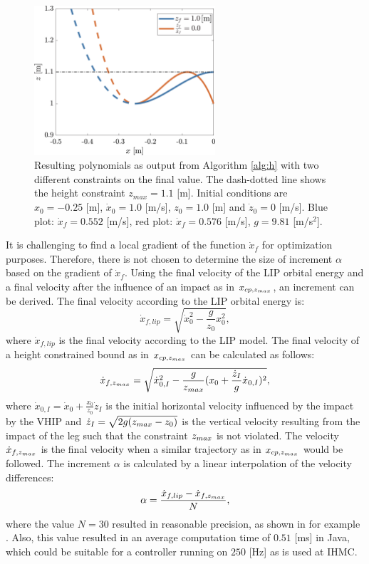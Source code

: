 \begin{figure}
\centering
\includegraphics[width=0.6\textwidth]{STYLESTUFF/polynomialHeightViz.png}
\caption{Resulting polynomials as output from Algorithm \ref{alg:h} with two different constraints on the final value. The dash-dotted line shows the height constraint $z_{max}=1.1$ [m]. Initial conditions are $x_0=-0.25$ [m], $\dot{x}_0=1.0$ [m/s], $z_0=1.0$ [m] and $\dot{z}_0=0$ [m/s]. Blue plot: $\dot{x}_f=0.552$ [m/s], red plot: $\dot{x}_f=0.576$ [m/s], $g=9.81$ [m/s$^2$]. }
\label{fig:polheight}
\end{figure}

It is challenging to find a local gradient of the function $\dot{x}_f$ for optimization purposes. Therefore, there is not chosen to determine the size of increment $\alpha$ based on the gradient of $\dot{x}_f$. Using the final velocity of the \ac{LIP} orbital energy and a final velocity after the influence of an impact as in $x_{cp,z_{max}}$, an increment can be derived. 
The final velocity according to the \ac{LIP} orbital energy is:
\begin{equation}
	\dot{x}_{f,lip} = \sqrt{\dot{x}_0^2-\frac{g}{z_0}x_0^2},
\end{equation}
where $\dot{x}_{f,lip}$ is the final velocity according to the \ac{LIP} model. The final velocity of a height constrained bound as in $x_{cp,z_{max}}$ can be calculated as follows:
\begin{equation}
	\dot{x}_{f,z_{max}} = \sqrt{\dot{x}_{0,I}^2-\frac{g}{z_{max}}(x_0+\frac{\dot{z}_I}{g}\dot{x}_{0,I})^2},
\end{equation}
where $\dot{x}_{0,I}=\dot{x}_0 + \frac{x_0}{z_0}\dot{z}_I$ is the initial horizontal velocity influenced by the impact by the \ac{VHIP} and $\dot{z}_I = \sqrt{2g(z_{max}-z_0)}$ is the vertical velocity resulting from the impact of the leg such that the constraint $z_{max}$ is not violated. The velocity $\dot{x}_{f,z_{max}}$ is the final velocity when a similar trajectory as in $x_{cp,z_{max}}$ would be followed. The increment $\alpha$ is calculated by a linear interpolation of the velocity differences:
\begin{equation}
	\alpha =\frac{\dot{x}_{f,lip} -\dot{x}_{f,z_{max}}}{N},
\end{equation}
where the value $N=30$ resulted in reasonable precision, as shown in for example . Also, this value resulted in an average computation time of $0.51$ [ms] in Java, which could be suitable for a controller running on $250$ [Hz] as is used at \ac{IHMC}.


